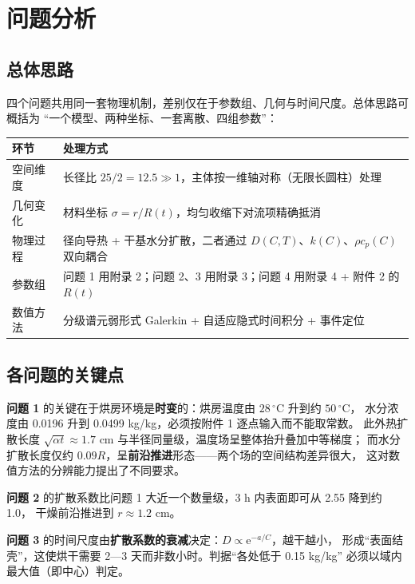 \documentclass[12pt,a4paper]{ctexart}
\newcommand{\ee}{\mathrm{e}}
\begin{document}
\section{问题分析}

\subsection{总体思路}
四个问题共用同一套物理机制，差别仅在于参数组、几何与时间尺度。总体思路可概括为
“一个模型、两种坐标、一套离散、四组参数”：

\begin{center}
\small
\begin{tabular}{@{}ll@{}}
\toprule
环节 & 处理方式 \\
\midrule
空间维度 & 长径比 $25/2=12.5\gg1$，主体按一维轴对称（无限长圆柱）处理 \\
几何变化 & 材料坐标 $\sigma=r/R(t)$，均匀收缩下对流项精确抵消 \\
物理过程 & 径向导热 + 干基水分扩散，二者通过 $D(C,T)$、$k(C)$、$\rho c_p(C)$ 双向耦合 \\
参数组 & 问题 1 用附录 2；问题 2、3 用附录 3；问题 4 用附录 4 + 附件 2 的 $R(t)$ \\
数值方法 & 分级谱元弱形式 Galerkin + 自适应隐式时间积分 + 事件定位 \\
\bottomrule
\end{tabular}
\end{center}

\subsection{各问题的关键点}

\textbf{问题 1} 的关键在于烘房环境是\textbf{时变}的：烘房温度由 $28\,^\circ$C 升到约 $50\,^\circ$C，
水分浓度由 0.0196 升到 0.0499 kg/kg，必须按附件 1 逐点输入而不能取常数。
此外热扩散长度 $\sqrt{\alpha t}\approx1.7$ cm 与半径同量级，温度场呈整体抬升叠加中等梯度；
而水分扩散长度仅约 $0.09R$，呈\textbf{前沿推进}形态——两个场的空间结构差异很大，
这对数值方法的分辨能力提出了不同要求。

\textbf{问题 2} 的扩散系数比问题 1 大近一个数量级，3 h 内表面即可从 2.55 降到约 1.0，
干燥前沿推进到 $r\approx1.2$ cm。

\textbf{问题 3} 的时间尺度由\textbf{扩散系数的衰减}决定：$D\propto\ee^{-a/C}$，越干越小，
形成“表面结壳”，这使烘干需要 2—3 天而非数小时。判据“各处低于 0.15 kg/kg”
必须以域内最大值（即中心）判定。
\end{document}

